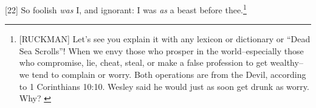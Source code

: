 [22] \textcolor[rgb]{0.00,0.00,1.00}{So foolish \emph{was} I, and ignorant: I was \emph{as} a beast before thee.}\footnote{[RUCKMAN] Let’s see you explain it with any lexicon or dictionary or “Dead Sea Scrolls”! When we envy those who prosper in the world--especially those who compromise, lie, cheat, steal, or make a false profession to get wealthy--we tend to complain or worry. Both operations are from the Devil, according to 1 Corinthians 10:10. Wesley said he would just as soon get drunk as worry. Why?  \cite{Ruckman1992Psalms}  }
